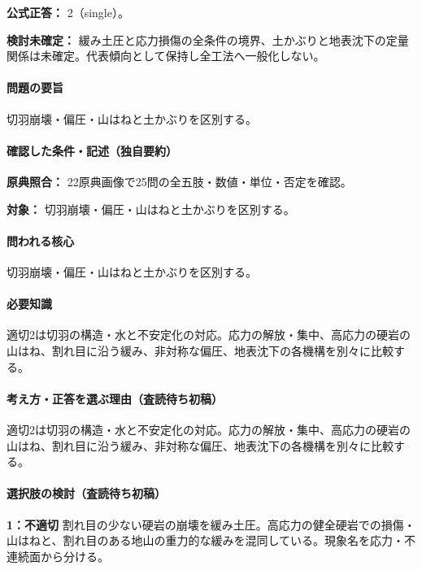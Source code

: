 \textbf{公式正答：} 2（single）。

\par\textbf{検討未確定：} 緩み土圧と応力損傷の全条件の境界、土かぶりと地表沈下の定量関係は未確定。代表傾向として保持し全工法へ一般化しない。

\paragraph{問題の要旨} 切羽崩壊・偏圧・山はねと土かぶりを区別する。

\paragraph{確認した条件・記述（独自要約）}\mbox{}\par

\noindent\textbf{原典照合：} 22原典画像で25問の全五肢・数値・単位・否定を確認。\par

\noindent\textbf{対象：} 切羽崩壊・偏圧・山はねと土かぶりを区別する。\par

\paragraph{問われる核心} 切羽崩壊・偏圧・山はねと土かぶりを区別する。

\paragraph{必要知識} 適切2は切羽の構造・水と不安定化の対応。応力の解放・集中、高応力の硬岩の山はね、割れ目に沿う緩み、非対称な偏圧、地表沈下の各機構を別々に比較する。

\paragraph{考え方・正答を選ぶ理由（査読待ち初稿）} 適切2は切羽の構造・水と不安定化の対応。応力の解放・集中、高応力の硬岩の山はね、割れ目に沿う緩み、非対称な偏圧、地表沈下の各機構を別々に比較する。

\paragraph{選択肢の検討（査読待ち初稿）}\mbox{}\par

\noindent\textbf{1：不適切} 割れ目の少ない硬岩の崩壊を緩み土圧。高応力の健全硬岩での損傷・山はねと、割れ目のある地山の重力的な緩みを混同している。現象名を応力・不連続面から分ける。\par

